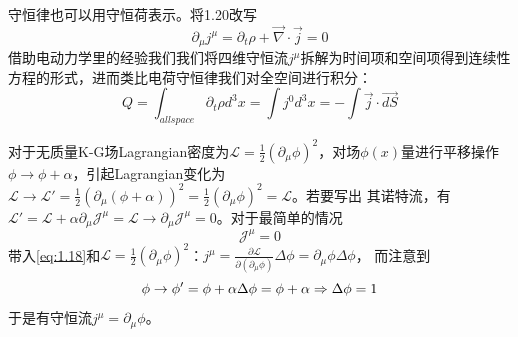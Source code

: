 \documentclass[../main.tex]{subfiles}
\begin{document}
    守恒律也可以用守恒荷表示。将1.20改写
    \begin{equation}
        \partial_{\mu} j^{\mu} = \partial_t \rho +\overrightarrow{\nabla} \cdot \overrightarrow{j} = 0 
    \end{equation}
    借助电动力学里的经验我们我们将四维守恒流$j^{\mu}$拆解为时间项和空间项得到连续性方程的形式，进而类比电荷守恒律我们对全空间进行积分：
    \begin{equation}
        Q = \int_{all space} \partial_t \rho d^3x = \int j^0 d^3x = - \int \overrightarrow{j} \cdot \overrightarrow{dS}
    \end{equation}
\begin{example}
    对于无质量K-G场Lagrangian密度为$\mathcal{L} = \frac{1}{2}(\partial_{\mu}\phi)^2 $，对场$\phi(x)$量进行平移操作$\phi\rightarrow\phi+\alpha$，引起Lagrangian变化为
    $\mathcal{L}\rightarrow\mathcal{L}' = \frac{1}{2}\left( \partial_{\mu}(\phi + \alpha) \right)^2 = \frac{1}{2}(\partial_{\mu}\phi)^2 =\mathcal{L}$。若要写出
    其诺特流，有$\mathcal{L}' = \mathcal{L} + \alpha \partial_{\mu}\mathcal{J}^{\mu} = \mathcal{L} \rightarrow \partial_{\mu}\mathcal{J}^{\mu} = 0$。对于最简单的情况
    \begin{equation}
        \mathcal{J}^{\mu} = 0 \label{eq:1.21}
    \end{equation}
    带入\eqref{eq:1.18}和$\mathcal{L} = \frac{1}{2}(\partial_{\mu}\phi)^2 $：$j^{\mu} = \frac{\partial \mathcal{L}}{\partial (\partial_{\mu}\phi)} \Delta\phi = \partial_{\mu} \phi \Delta \phi$，
    而注意到
    \begin{equation}
        \phi \rightarrow \phi' = \phi + \alpha \Delta \phi = \phi + \alpha \Rightarrow \Delta \phi = 1 \notag
    \end{equation}
    于是有守恒流$j^{\mu} = \partial_{\mu}\phi$。
\end{example}
\end{document}
